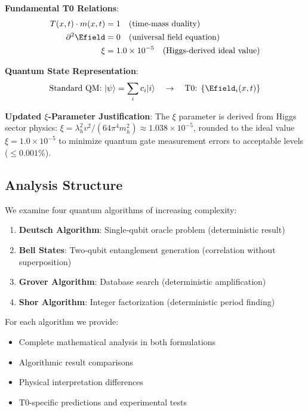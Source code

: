 	\begin{tcolorbox}[colback=blue!5!white,colframe=blue!75!black,title=Core T0 Principles with Updated $\xi$ Parameter]
		\textbf{Fundamental T0 Relations}:
		\begin{align}
			T(x,t) \cdot m(x,t) &= 1 \quad \text{(time-mass duality)} \\
			\partial^2 \Efield &= 0 \quad \text{(universal field equation)} \\
			\xi &= 1.0 \times 10^{-5} \quad \text{(Higgs-derived ideal value)}
		\end{align}
		
		\textbf{Quantum State Representation}:
		\begin{equation}
			\text{Standard QM: } |\psi\rangle = \sum_i c_i |i\rangle \quad \rightarrow \quad \text{T0: } \{\Efield_i(x,t)\}
		\end{equation}
		
		\textbf{Updated $\xi$-Parameter Justification}:
		The $\xi$ parameter is derived from Higgs sector physics: $\xi = \lambda_h^2 v^2/(64\pi^4 m_h^2) \approx 1.038 \times 10^{-5}$, rounded to the ideal value $\xi = 1.0 \times 10^{-5}$ to minimize quantum gate measurement errors to acceptable levels ($\leq 0.001\%$).
	\end{tcolorbox}
	
	\subsection{Analysis Structure}
	
	We examine four quantum algorithms of increasing complexity:
	
	\begin{enumerate}
		\item \textbf{Deutsch Algorithm}: Single-qubit oracle problem (deterministic result)
		\item \textbf{Bell States}: Two-qubit entanglement generation (correlation without superposition)
		\item \textbf{Grover Algorithm}: Database search (deterministic amplification)
		\item \textbf{Shor Algorithm}: Integer factorization (deterministic period finding)
	\end{enumerate}
	
	For each algorithm we provide:
	\begin{itemize}
		\item Complete mathematical analysis in both formulations
		\item Algorithmic result comparisons
		\item Physical interpretation differences
		\item T0-specific predictions and experimental tests
	\end{itemize}
	

